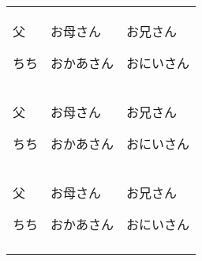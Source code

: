 \documentclass[12pt,a4j, landscape, dvipdfmx]{utarticle}
\def\cell(#1,#2){\rule{0pt}{3ex} \hspace*{-.4cm} {\LARGE #1} \newline \rule{0pt}{4ex} \hspace*{1cm} {\small #2}}
\begin{document}
\newcommand\T{\rule{0pt}{2.6ex}} 


\begin{tabular}{||p{5cm} || p{5cm} || p{5cm} ||}
\hhline{|t:=:t:=:t:=:t|}
\cell(父,ちち) & \cell(お母さん,おかあさん) & \cell(お兄さん,おにいさん) \tabularnewline 

\hhline{|:=::=::=:|}
\cell(父,ちち) & \cell(お母さん,おかあさん) & \cell(お兄さん,おにいさん) \tabularnewline

\hhline{|:=::=::=:|}
\cell(父,ちち) & \cell(お母さん,おかあさん) & \cell(お兄さん,おにいさん) \tabularnewline

\hhline{|b:=:b:=:b:=:b|}
\end{tabular} 
\end{document}
